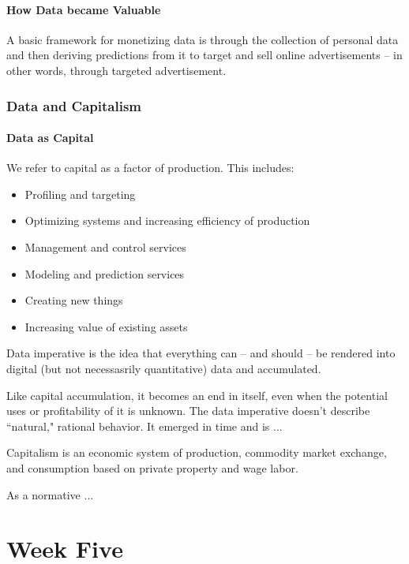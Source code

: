 \documentclass[openany]{book}
\begin{document}
\subsubsection{How Data became Valuable}
A basic framework for monetizing data is through the collection of personal data and then deriving predictions from it to target and sell online advertisements -- in other words, through targeted advertisement.

\subsection{Data and Capitalism}
\subsubsection{Data as Capital}
\begin{defn}
	We refer to capital as a factor of production. This includes:
	\begin{itemize}
		\item Profiling and targeting
		\item Optimizing systems and increasing efficiency of production
		\item Management and control services
		\item Modeling and prediction services
		\item Creating new things
		\item Increasing value of existing assets
	\end{itemize}
\end{defn}

\begin{defn}
	Data imperative is the idea that everything can -- and should -- be rendered into digital (but not necessasrily quantitative) data and accumulated.
\end{defn}

Like capital accumulation, it becomes an end in itself, even when the potential uses or profitability of it is unknown. The data imperative doesn't describe ``natural," rational behavior. It emerged in time and is ...

\begin{defn}
	Capitalism is an economic system of production, commodity market exchange, and consumption based on private property and wage labor.
	
	As a normative ...
\end{defn}

\chapter{Week Five}
\end{document}
